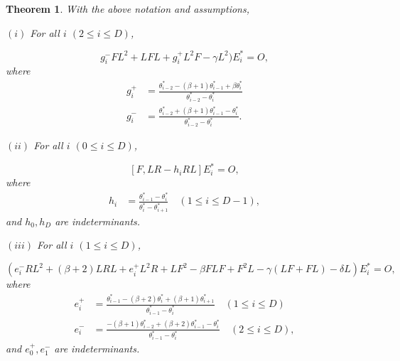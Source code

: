 \documentclass[
]{book}
\newtheorem{theorem}{Theorem}[chapter]
\theoremstyle{definition}
\theoremstyle{definition}
\theoremstyle{definition}
\theoremstyle{definition}
\theoremstyle{remark}
\begin{document}
\begin{theorem}
\protect\hypertarget{thm:rfl-relations}{}\label{thm:rfl-relations}With the above notation and assumptions,

\((i)\) For all \(i\) \((2\leq i\leq D)\),

\[g^-_iFL^2 + LFL + g^+_iL^2F - \gamma L^2)E^*_i = O,\]
where
\begin{align}
g^+_i & = \frac{\theta^*_{i-2}-(\beta+1)\theta^*_{i-1}+\beta\theta^*_i}{\theta^*_{i-2}-\theta^*_i}\\
g^-_i & = \frac{\theta^*_{i-2}+(\beta+1)\theta^*_{i-1}-\theta^*_i}{\theta^*_{i-2}-\theta^*_i}.
\end{align}

\((ii)\) For all \(i\) \((0\leq i\leq D)\),

\[[F, LR - h_iRL]E^*_i = O,\]
where
\begin{align}
h_i & = \frac{\theta^*_{i-1}-\theta^*_i}{\theta^*_i-\theta^*_{i+1}} \quad (1\leq i\leq D-1),
\end{align}
and \(h_0, h_D\) are indeterminants.

\((iii)\) For all \(i\) \((1\leq i\leq D)\),

\[(e^-_iRL^2 + (\beta+2)LRL + e^+_iL^2R + LF^2 - \beta FLF + F^2L - \gamma(LF+FL) - \delta L)E^*_i = O,\]
where
\begin{align}
e^+_i & = \frac{\theta^*_{i-1}-(\beta+2)\theta^*_{i}+(\beta+1)\theta^*_{i+1}}{\theta^*_{i-1}-\theta^*_i} \quad (1\leq i\leq D)\\
e^-_i & = \frac{-(\beta+1)\theta^*_{i-2}+(\beta+2)\theta^*_{i-1}-\theta^*_i}{\theta^*_{i-1}-\theta^*_i} \quad (2\leq i\leq D),
\end{align}
and \(e^+_0, e^-_1\) are indeterminants.
\end{theorem}
\end{document}
